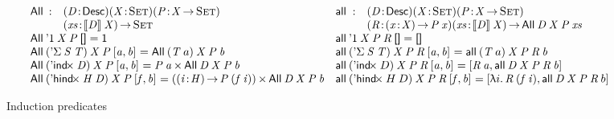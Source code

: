 \begin{figure*}

\[
\begin{array}{ll}
\stk{
\begin{array}{@{}ll}
\All{\!}{\!}{\!}{\!} : & \PITEL{\V{D}}{\Desc}
                         \PITEL{\V{X}}{\Set}
                         \PITEL{\V{P}}{\V{X} \To \Set} \\
                       & \PI{\V{xs}}{\descop{\V{D}}{\V{X}}} 
                         \Set 
\end{array} \\
\All{\DUnit}{\V{X}}{\V{P}}{\Void} = 
    \Unit \\
\All{(\DSigma{\V{S}}{\V{T}})}{\V{X}}{\V{P}}{\pair{\V{a}}{\V{b}}{}} = 
    \All{(\V{T}\: a)}{\V{X}}{\V{P}}{\V{b}} \\
\All{(\DIndx{\V{D}})}{\V{X}}{\V{P}}{\pair{\V{a}}{\V{b}}{}} =
    \TIMES{\V{P}\: \V{a}}{\All{\V{D}}{\V{X}}{\V{P}}{\V{b}}} \\
\All{(\DHindx{\V{H}}{\V{D}})}{\V{X}}{\V{P}}{\pair{\V{f}}{\V{b}}{}} =
    \TIMES{(\PI{\V{i}}{\V{H}} \V{P}\: (\V{f}\: \V{i}))}
          {\All{\V{D}}{\V{X}}{\V{P}}{\V{b}}}
}
&
\stk{
\begin{array}{@{}ll}
\all{\!}{\!}{\!}{\!}{\!} : & \PITEL{\V{D}}{\Desc}
                             \PITEL{\V{X}}{\Set}
                             \PITEL{\V{P}}{\V{X} \To \Set} \\
                           & \PITEL{\V{R}}{\PI{\V{x}}{\V{X}} \V{P}\: \V{x}}
                             \PI{\V{xs}}{\descop{\V{D}}{\V{X}}} 
                             \All{\V{D}}{\V{X}}{\V{P}}{\V{xs}} 
\end{array} \\
\all{\DUnit}{\V{X}}{\V{P}}{\V{R}}{\Void} =
    \Void \\
\all{(\DSigma{\V{S}}{\V{T}})}{\V{X}}{\V{P}}{\V{R}}{\pair{\V{a}}{\V{b}}{}} =
    \all{(\V{T}\: a)}{\V{X}}{\V{P}}{\V{R}}{\V{b}} \\
\all{(\DIndx{D})}{\V{X}}{\V{P}}{\V{R}}{\pair{\V{a}}{\V{b}}{}} =
    \pair{\V{R}\: \V{a}}
         {\all{\V{D}}{\V{X}}{\V{P}}{\V{R}}{\V{b}}}{} \\
\all{(\DHindx{H}{D})}{\V{X}}{\V{P}}{\V{R}}{\pair{\V{f}}{\V{b}}{}} =
    \pair{\LAM{i} \V{R}\: (\V{f}\: \V{i})}
         {\all{\V{D}}{\V{X}}{\V{P}}{\V{R}}{b}}{}
\end{array}
}
\]

\caption{Induction predicates}
\label{fig:all-predicates}

\end{figure*}


